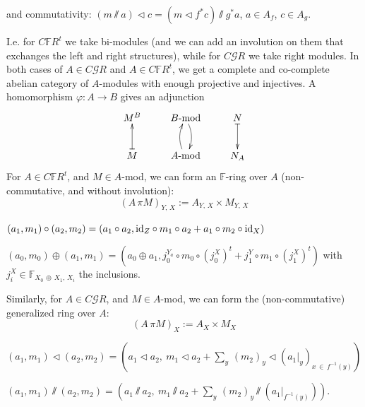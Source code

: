 \documentclass[leqno]{article}
\numberwithin{equation}{section}
\begin{document}
and commutativity: $(m \sslash a) \lhd c = (m \lhd f^* c) \sslash g^* a$, $a \in A_f$, $c \in A_g$.

\bigskip

I.e. for $C{\mathbb F} R^t$ we take bi-modules (and we can add an involution on them that exchanges the left and right structures), while for $C {\mathcal G} R$ we take right modules. In both cases of $A \in C{\mathcal G} R$ and $A \in C{\mathbb F} R^t$, we get a complete and co-complete abelian category of $A$-modules with enough projective and injectives. A homomorphism $\varphi : A \to B$ gives an adjunction
\setcounter{equation}{2}
\begin{equation}
\label{eq63}
\xymatrix{
M^B &\mbox{$B$-mod} \ar@/^/[d] &N \ar@{|->}[d] \\
M \ar@{|->}[u] &\mbox{$A$-mod}\ar@/^/[u] &N_A
}
\end{equation}
For $A \in C{\mathbb F} R^t$, and $M \in A$-mod, we can form an ${\mathbb F}$-ring over $A$ (non-commutative, and without involution):
\begin{equation}
\label{eq64}
(A \, \pi M)_{Y , \, X} := A_{Y, \, X} \times M_{Y , \, X}
\end{equation}

\medskip

 $(a_1 , m_1) \circ (a_2 , m_2) = (a_1 \circ a_2 , {\rm id}_Z \circ m_1 \circ a_2 + a_1 \circ m_2 \circ {\rm id}_X)$

\medskip

 $(a_0 , m_0) \oplus (a_1 , m_1) = (a_0 \oplus a_1 , j_0^{Y_a} \circ m_0 \circ (j_0^X)^t + j_1^Y \circ m_1 \circ (j_1^X)^t)$ with $j_i^X \in {\mathbb F}_{X_0 \, \oplus \, X_1 , \, X_i}$ the inclusions.

\medskip

Similarly, for $A \in C{\mathcal G} R$, and $M \in A$-mod, we can form the (non-commutative) generalized ring over $A$:
\begin{equation}
\label{eq65}
(A \, \pi M)_X := A_X \times M_X
\end{equation}

\medskip

 $(a_1 , m_1) \lhd (a_2 , m_2) = \left(a_1 \lhd a_2 , \ m_1 \lhd a_2 + \underset{y}{\sum} \, (m_2)_y \lhd (a_1\vert _y )_{x \, \in \, f^{-1} (y)} \right)$

\medskip

 $(a_1 , m_1) \sslash (a_2 , m_2) = \left( a_1 \sslash a_2 , \ m_1 \sslash a_2 + \underset{y}{\sum} \, (m_2)_y \sslash (a_1 \vert_{f^{-1} (y)}) \right)$.
\end{document}
